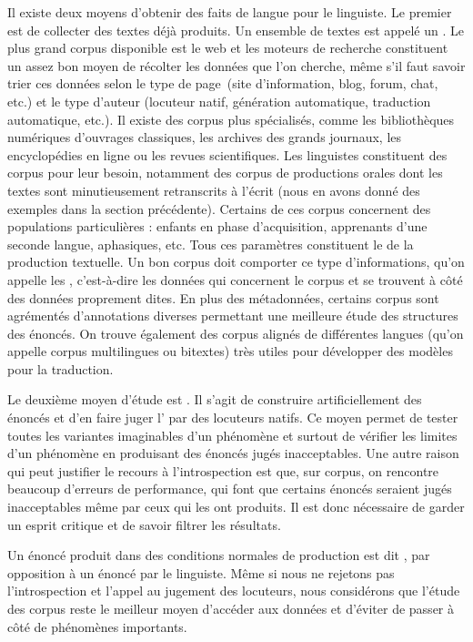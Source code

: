 Il existe deux moyens d’obtenir des faits de langue pour le linguiste. Le premier est de collecter des textes déjà produits. Un ensemble de textes est appelé un . Le plus grand corpus disponible est le web et les moteurs de recherche constituent un assez bon moyen de récolter les données que l’on cherche, même s’il faut savoir trier ces données selon le type de page~(site d’information, blog, forum, chat, etc.) et le type d’auteur (locuteur natif, génération automatique, traduction automatique, etc.). Il existe des corpus plus spécialisés, comme les bibliothèques numériques d’ouvrages classiques, les archives des grands journaux, les encyclopédies en ligne ou les revues scientifiques. Les linguistes constituent des corpus pour leur besoin, notamment des corpus de productions orales dont les textes sont minutieusement retranscrits à l’écrit (nous en avons donné des exemples dans la section précédente). Certains de ces corpus concernent des populations particulières : enfants en phase d’acquisition, apprenants d’une seconde langue, aphasiques, etc. Tous ces paramètres constituent le  de la production textuelle. Un bon corpus doit comporter ce type d’informations, qu’on appelle les , c’est-à-dire les données qui concernent le corpus et se trouvent à côté des données proprement dites. En plus des métadonnées, certains corpus sont agrémentés d’annotations diverses permettant une meilleure étude des structures des énoncés. On trouve également des corpus alignés de différentes langues (qu’on appelle corpus multilingues ou bitextes) très utiles pour développer des modèles pour la traduction.

Le deuxième moyen d’étude est . Il s’agit de construire artificiellement des énoncés et d’en faire juger l’ par des locuteurs natifs. Ce moyen permet de tester toutes les variantes imaginables d’un phénomène et surtout de vérifier les limites d’un phénomène en produisant des énoncés jugés inacceptables. Une autre raison qui peut justifier le recours à l’introspection est que, sur corpus, on rencontre beaucoup d’erreurs de performance, qui font que certains énoncés seraient jugés inacceptables même par ceux qui les ont produits. Il est donc nécessaire de garder un esprit critique et de savoir filtrer les résultats.

Un énoncé produit dans des conditions normales de production est dit , par opposition à un énoncé  par le linguiste. Même si nous ne rejetons pas l’introspection et l’appel au jugement des locuteurs, nous considérons que l’étude des corpus reste le meilleur moyen d’accéder aux données et d’éviter de passer à côté de phénomènes importants.

